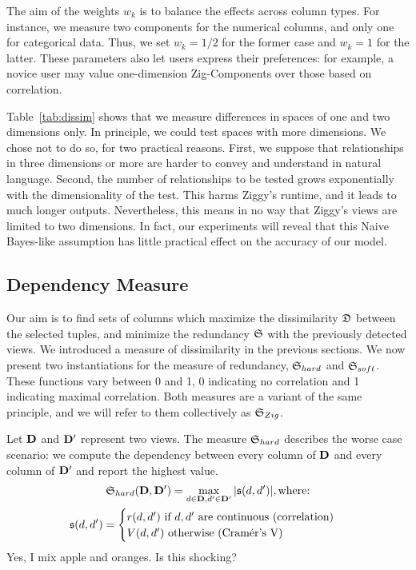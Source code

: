 The aim of the weights $w_k$ is to balance the effects across column types. For
instance, we measure two components for the numerical columns, and only one for
categorical data.  Thus, we set $w_k = 1/2$ for the former case and $w_k = 1$
for the latter.  These parameters also let users express their preferences: for
example, a novice user may value one-dimension Zig-Components over those based
on correlation.

Table~\ref{tab:dissim} shows that we measure differences in spaces of one and
two dimensions only.  In principle, we could test spaces with more dimensions.
We chose not to do so, for two practical reasons. First, we suppose that
relationships in three dimensions or more are harder to convey and understand
in natural language.  Second, the number of relationships to be tested grows
exponentially with the dimensionality of the test. This harms Ziggy's runtime,
and it leads to much longer outputs. Nevertheless, this means in no way that
Ziggy's views are limited to two dimensions. In fact, our experiments will
reveal that this Naive Bayes-like assumption has little practical effect on the
accuracy of our model.


\subsection{Dependency Measure}
\label{sec:dependency}

Our aim is to find sets of columns which maximize the dissimilarity $\mathfrak{D}$
between the selected tuples, and minimize the redundancy $\mathfrak{S}$ with the
previously detected views. We introduced a measure of dissimilarity in the
previous sections. We now present two instantiations for the measure of
redundancy, $\mathfrak{S}_{hard}$ and $\mathfrak{S}_{soft}$. 
These functions vary between 0 and 1, 0 indicating no
correlation and 1 indicating maximal correlation. Both measures are a variant
of the same principle, and we will refer to them collectively as $\mathfrak{S}_{Zig}$.

Let $\mathbf{D}$ and $\mathbf{D}'$ represent two views. The measure $\mathfrak{S}_{hard}$
describes the worse case scenario: we compute the dependency between every
column of $\mathbf{D}$ and every column of  $\mathbf{D}'$ and report the highest value.
\begin{gather}
    \mathfrak{S}_{hard}(\mathbf{D}, \mathbf{D'}) = \max_{d \in \mathbf{D}, d' \in \mathbf{D'}}
    |\mathfrak{s}(d, d')|, \text{where:}\\
         \mathfrak{s}(d, d')= \begin{cases}
             r(d, d')\ \text{if $d, d'$ are continuous (correlation)}\\
             V(d, d')\ \text{otherwise (Cram\'er's V)}
         \end{cases}
\end{gather}
{\color{red} Yes, I mix apple and oranges. Is this shocking?}

